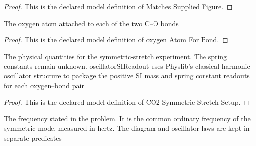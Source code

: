 \begin{proof}
  This is the declared model definition of Matches Supplied Figure.
\end{proof}
\begin{definition}
  \label{def:physics:phyx-mini-0207:phyxminiproblems-problemphyxmini0207-oxygenatomforbond}
  The oxygen atom attached to each of the two C--O bonds
\end{definition}
\begin{proof}
  This is the declared model definition of oxygen Atom For Bond.
\end{proof}
\begin{definition}
  \label{def:physics:phyx-mini-0207:phyxminiproblems-problemphyxmini0207-co2symmetricstretchsetup}
  The physical quantities for the symmetric-stretch experiment. The spring constants remain unknown. oscillatorSIReadout uses Physlib's classical harmonic-oscillator structure to package the positive SI mass and spring constant readouts for each oxygen--bond pair
\end{definition}
\begin{proof}
  This is the declared model definition of CO2 Symmetric Stretch Setup.
\end{proof}
\begin{definition}
  \label{def:physics:phyx-mini-0207:phyxminiproblems-problemphyxmini0207-matchesproblemstatement}
  The frequency stated in the problem. It is the common ordinary frequency of the symmetric mode, measured in hertz. The diagram and oscillator laws are kept in separate predicates
\end{definition}

